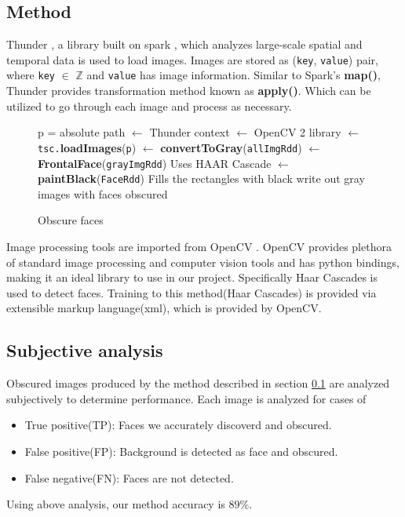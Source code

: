 \documentclass[
	submission,
	final,
	notitlepage,
	narroweqnarray,
	inline,
	twoside,
	]{ieee}
\begin{document}
\subsection{Method}\label{sec:MethodExp}
Thunder \cite{thunder}, a library built on spark \cite{spark}, which analyzes large-scale
spatial and temporal data is used to load images. Images are stored as ({\tt key}, {\tt value})
pair, where {\tt key} $\in$ $\mathbb{Z}$ and {\tt value} has image information. Similar to
Spark's {\bf map()}, Thunder provides transformation method known as {\bf apply()}. Which
can be utilized to go through each image and process as necessary.\\
\begin{figure}[h!]
  \begin{algorithmic}[1]
     \Comment p = absolute path
		 $\gets$ Thunder context
		 $\gets$ OpenCV 2 library
		 $\gets$ {\tt tsc.}{\bf loadImages}({\tt p})
		 $\gets$ {\bf convertToGray}({\tt allImgRdd})
		 $\gets$ {\bf FrontalFace}({\tt grayImgRdd}) \Comment Uses HAAR Cascade
		 $\gets$ {\bf paintBlack}({\tt FaceRdd}) \Comment Fills the rectangles with black
		 \Comment write out gray images with faces obscured
    \EndFunction
  \end{algorithmic}
  \caption{Obscure faces}
\end{figure}
Image processing tools are imported from OpenCV \cite{opencv}. OpenCV provides plethora of standard
image processing and computer vision tools and has python bindings, making it an ideal
library to use in our project. Specifically Haar Cascades is used to detect faces. Training
to this method(Haar Cascades) is provided via extensible markup language(xml), which is provided
by OpenCV.

\subsection{Subjective analysis}
Obscured images produced by the method described in section \ref{sec:MethodExp} are
analyzed subjectively to determine performance. Each image is analyzed for cases of
\begin{itemize}
	\item True positive(TP): Faces we accurately discoverd and obscured.
	\item False positive(FP): Background is detected as face and obscured.
	\item False negative(FN): Faces are not detected.
\end{itemize}
Using above analysis, our method accuracy is $89\%$. 
\end{document}
